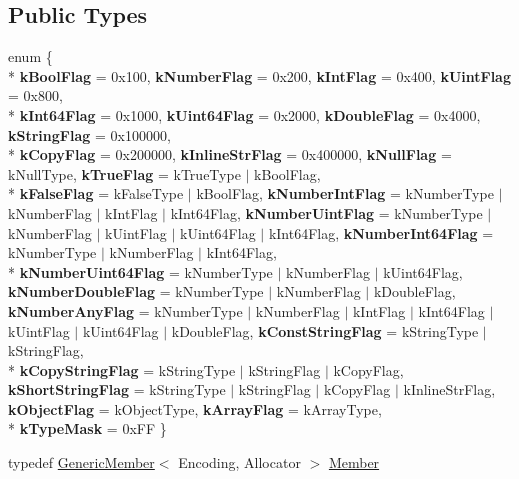 \subsection*{Public Types}
\begin{DoxyCompactItemize}
\item 
\hypertarget{class_generic_value_aacdfd9d0f85a6161380a134e6d0c9d3c}{}enum \{ \\*
{\bfseries k\+Bool\+Flag} = 0x100, 
{\bfseries k\+Number\+Flag} = 0x200, 
{\bfseries k\+Int\+Flag} = 0x400, 
{\bfseries k\+Uint\+Flag} = 0x800, 
\\*
{\bfseries k\+Int64\+Flag} = 0x1000, 
{\bfseries k\+Uint64\+Flag} = 0x2000, 
{\bfseries k\+Double\+Flag} = 0x4000, 
{\bfseries k\+String\+Flag} = 0x100000, 
\\*
{\bfseries k\+Copy\+Flag} = 0x200000, 
{\bfseries k\+Inline\+Str\+Flag} = 0x400000, 
{\bfseries k\+Null\+Flag} = k\+Null\+Type, 
{\bfseries k\+True\+Flag} = k\+True\+Type $\vert$ k\+Bool\+Flag, 
\\*
{\bfseries k\+False\+Flag} = k\+False\+Type $\vert$ k\+Bool\+Flag, 
{\bfseries k\+Number\+Int\+Flag} = k\+Number\+Type $\vert$ k\+Number\+Flag $\vert$ k\+Int\+Flag $\vert$ k\+Int64\+Flag, 
{\bfseries k\+Number\+Uint\+Flag} = k\+Number\+Type $\vert$ k\+Number\+Flag $\vert$ k\+Uint\+Flag $\vert$ k\+Uint64\+Flag $\vert$ k\+Int64\+Flag, 
{\bfseries k\+Number\+Int64\+Flag} = k\+Number\+Type $\vert$ k\+Number\+Flag $\vert$ k\+Int64\+Flag, 
\\*
{\bfseries k\+Number\+Uint64\+Flag} = k\+Number\+Type $\vert$ k\+Number\+Flag $\vert$ k\+Uint64\+Flag, 
{\bfseries k\+Number\+Double\+Flag} = k\+Number\+Type $\vert$ k\+Number\+Flag $\vert$ k\+Double\+Flag, 
{\bfseries k\+Number\+Any\+Flag} = k\+Number\+Type $\vert$ k\+Number\+Flag $\vert$ k\+Int\+Flag $\vert$ k\+Int64\+Flag $\vert$ k\+Uint\+Flag $\vert$ k\+Uint64\+Flag $\vert$ k\+Double\+Flag, 
{\bfseries k\+Const\+String\+Flag} = k\+String\+Type $\vert$ k\+String\+Flag, 
\\*
{\bfseries k\+Copy\+String\+Flag} = k\+String\+Type $\vert$ k\+String\+Flag $\vert$ k\+Copy\+Flag, 
{\bfseries k\+Short\+String\+Flag} = k\+String\+Type $\vert$ k\+String\+Flag $\vert$ k\+Copy\+Flag $\vert$ k\+Inline\+Str\+Flag, 
{\bfseries k\+Object\+Flag} = k\+Object\+Type, 
{\bfseries k\+Array\+Flag} = k\+Array\+Type, 
\\*
{\bfseries k\+Type\+Mask} = 0x\+F\+F
 \}\label{class_generic_value_aacdfd9d0f85a6161380a134e6d0c9d3c}

\item 
\hypertarget{class_generic_value_a7ccf27c44058b4c11c3efc6473afb886}{}typedef \hyperlink{struct_generic_member}{Generic\+Member}$<$ Encoding, Allocator $>$ \hyperlink{class_generic_value_a7ccf27c44058b4c11c3efc6473afb886}{Member}\label{class_generic_value_a7ccf27c44058b4c11c3efc6473afb886}


\end{DoxyCompactItemize}

